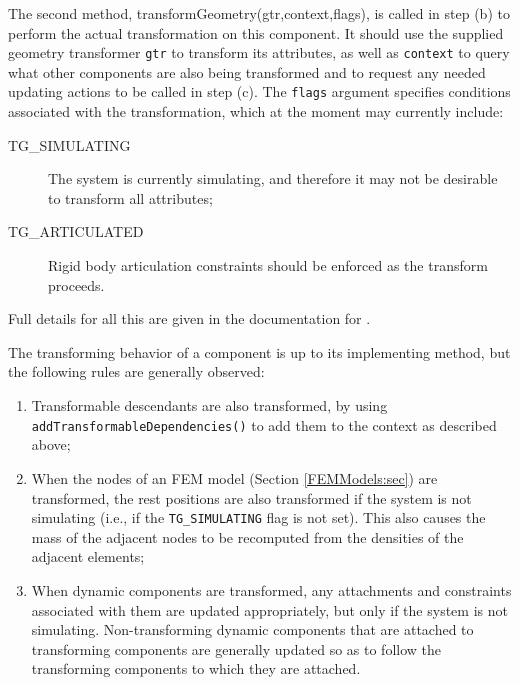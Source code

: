 The second method, 
%
{transformGeometry(gtr,context,flags)}, is
called in step (b) to perform the actual transformation on this
component.  It should use the supplied geometry transformer {\tt gtr}
to transform its attributes, as well as {\tt context} to query what
other components are also being transformed and to request
any needed updating actions to be called in step (c).  The {\tt flags} argument
specifies conditions associated with the transformation, which at the
moment may currently include:

\begin{description}

\item[TG\_SIMULATING]\mbox{}

The system is currently simulating, and therefore it may not be
desirable to transform all attributes;

\item[TG\_ARTICULATED]\mbox{}

Rigid body articulation constraints should
be enforced as the transform proceeds.

\end{description}

Full details for all this are given in the documentation for
.

The transforming behavior of a component is up to its implementing
method, but the following rules are generally observed:

\begin{enumerate}

\item Transformable descendants are also transformed, by using {\tt
addTransformableDependencies()} to add them to the context as described
above;

\item When the nodes of an FEM model (Section \ref{FEMModels:sec}) are
transformed, the rest positions are also transformed if the system is
not simulating (i.e., if the {\tt TG\_SIMULATING} flag is not set).
This also causes the mass of the adjacent nodes to be recomputed from
the densities of the adjacent elements;

\item When dynamic components are transformed, any attachments and constraints
associated with them are updated appropriately, but only if the system is not
simulating. Non-transforming dynamic components that are attached to
transforming components are generally updated so as to follow the transforming
components to which they are attached.

\end{enumerate}

